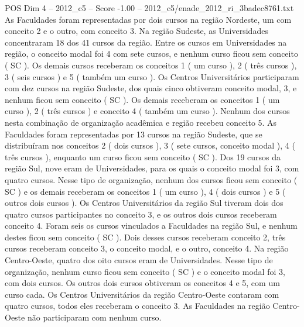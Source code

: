 \begin{textsample}{POS Dim 4 – 2012\_c5 – Score -1.00 – 2012\_c5/enade\_2012\_ri\_3badec8761.txt}
As Faculdades foram representadas por dois cursos na região Nordeste, um com conceito 2 e o outro, com conceito 3.
Na região Sudeste, as Universidades concentraram 18 dos 41 cursos da região.
Entre os cursos em Universidades na região, o conceito modal foi 4 com sete cursos, e nenhum curso ficou sem conceito ( SC ).
Os demais cursos receberam os conceitos 1 ( um curso ), 2 ( três cursos ), 3 ( seis cursos ) e 5 ( também um curso ).
Os Centros Universitários participaram com dez cursos na região Sudeste, dos quais cinco obtiveram conceito modal, 3, e nenhum ficou sem conceito ( SC ).
Os demais receberam os conceitos 1 ( um curso ), 2 ( três cursos ) e conceito 4 ( também um curso ).
Nenhum dos cursos nesta combinação de organização acadêmica e região recebeu conceito 5.
As Faculdades foram representadas por 13 cursos na região Sudeste, que se distribuíram nos conceitos 2 ( dois cursos ), 3 ( sete cursos, conceito modal ), 4 ( três cursos ), enquanto um curso ficou sem conceito ( SC ).
Dos 19 cursos da região Sul, nove eram de Universidades, para os quais o conceito modal foi 3, com quatro cursos.
Nesse tipo de organização, nenhum dos cursos ficou sem conceito ( SC ) e os demais receberam os conceitos 1 ( um curso ), 4 ( dois cursos ) e 5 ( outros dois cursos ).
Os Centros Universitários da região Sul tiveram dois dos quatro cursos participantes no conceito 3, e os outros dois cursos receberam conceito 4.
Foram seis os cursos vinculados a Faculdades na região Sul, e nenhum destes ficou sem conceito ( SC ).
Dois desses cursos receberam conceito 2, três cursos receberam conceito 3, o conceito modal, e o outro, conceito 4.
Na região Centro-Oeste, quatro dos oito cursos eram de Universidades.
Nesse tipo de organização, nenhum curso ficou sem conceito ( SC ) e o conceito modal foi 3, com dois cursos.
Os outros dois cursos obtiveram os conceitos 4 e 5, com um curso cada.
Os Centros Universitários da região Centro-Oeste contaram com quatro cursos, todos eles receberam o conceito 3.
As Faculdades na região Centro-Oeste não participaram com nenhum curso.

\end{textsample}
